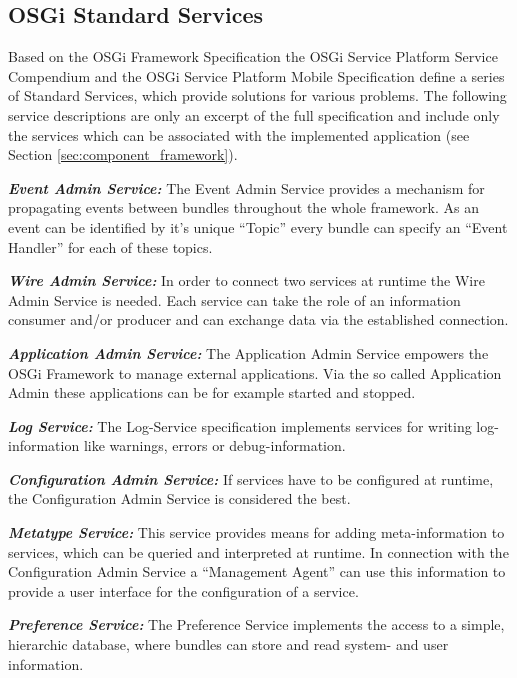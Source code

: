\subsection{OSGi Standard Services}
\label{sec:standard_services}
Based on the OSGi Framework Specification the OSGi Service Platform Service
Compendium and the OSGi Service Platform Mobile Specification define a series
of Standard Services, which provide solutions for various problems.\newline
The following service descriptions are only an excerpt of the full
specification and include only the services which can be associated with the
implemented application (see Section \ref{sec:component_framework}).

\noindent\textbf{\textit{Event Admin Service:}} The Event Admin Service
provides a mechanism for propagating events between bundles throughout the whole
framework. As an event can be identified by it's unique ``Topic'' every bundle
can specify an ``Event Handler'' for each of these topics.

\noindent\textbf{\textit{Wire Admin Service:}} In order to connect two services
at runtime the Wire Admin Service is needed. Each service can take the role of
an information consumer and/or producer and can exchange data via the
established connection.

\noindent\textbf{\textit{Application Admin Service:}} The Application Admin
Service empowers the OSGi Framework to manage external applications. Via the so
called Application Admin these applications can be for example started and
stopped.

\noindent\textbf{\textit{Log Service:}} The Log-Service specification implements
services for writing log-information like warnings, errors or debug-information.

\noindent\textbf{\textit{Configuration Admin Service:}} If services have to be
configured at runtime, the Configuration Admin Service is considered the best.

\noindent\textbf{\textit{Metatype Service:}} This service provides means for
adding meta-information to services, which can be queried and interpreted at
runtime. In connection with the Configuration Admin Service a ``Management Agent''
can use this information to provide a user interface for the configuration of a
service.

\noindent\textbf{\textit{Preference Service:}} The Preference Service implements the access to a
simple, hierarchic database, where bundles can store and read system- and user information.


